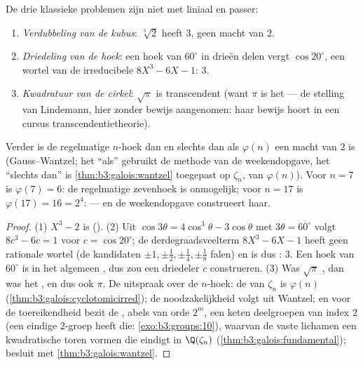 \begin{corollary}\label{cor:b3:galois:impossible}
De drie klassieke problemen zijn niet  met liniaal en
passer:
\begin{enumerate}
  \item \emph{Verdubbeling van de kubus}: $\sqrt[3]2$ heeft 
        $3$, geen macht van $2$.
  \item \emph{Driedeling van de hoek}: een hoek van $60^\circ$ in
        drieën delen vergt $\cos 20^\circ$, een wortel van de
        irreducibele $8X^3 - 6X - 1$:  $3$.
  \item \emph{Kwadratuur van de cirkel}: $\sqrt\pi$ is
        transcendent (want $\pi$ is het --- de stelling van
        Lindemann, hier zonder bewijs aangenomen: haar bewijs
        hoort in een cursus transcendentietheorie).
\end{enumerate}
Verder is de regelmatige $n$-hoek  dan en slechts
dan als $\varphi(n)$ een macht van $2$ is (Gauss--Wantzel; het
``als'' gebruikt de methode van de weekendopgave, het ``slechts
dan'' is \cref{thm:b3:galois:wantzel} toegepast op $\zeta_n$, van
 $\varphi(n)$). Voor $n = 7$ is $\varphi(7) = 6$: de
regelmatige zevenhoek is onmogelijk; voor $n = 17$ is $\varphi(17)
= 16 = 2^4$:  --- en de weekendopgave construeert
haar.
\end{corollary}

\begin{proof}
(1) $X^3 - 2$ is  (). (2) Uit $\cos 3\theta =
4\cos^3\theta - 3\cos\theta$ met $3\theta = 60^\circ$ volgt $8c^3
- 6c = 1$ voor $c = \cos 20^\circ$; de derdegraadsveelterm $8X^3 -
6X - 1$ heeft geen rationale wortel (de kandidaten $\pm1,
\pm\frac 12, \pm\frac14, \pm\frac18$ falen) en is dus
:  $3$. Een hoek van $60^\circ$ is in het algemeen
, dus zou een driedeler $c$ construeren. (3) Was
$\sqrt\pi$ , dan was het , en dus ook
$\pi$. De uitspraak over de $n$-hoek: de  van $\zeta_n$ is
$\varphi(n)$ (\cref{thm:b3:galois:cyclotomicirred}); de
noodzakelijkheid volgt uit Wantzel; en voor de toereikendheid
bezit de , abels van orde $2^m$, een keten deelgroepen
van index $2$ (een eindige $2$-groep heeft die:
\cref{exo:b3:groups:10}), waarvan de vaste lichamen een
kwadratische toren vormen die eindigt in $\Q(\zeta_n)$
(\cref{thm:b3:galois:fundamental}); besluit met
\cref{thm:b3:galois:wantzel}.
\end{proof}

